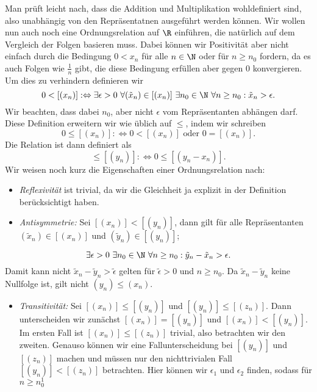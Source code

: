 \documentclass[letterpaper,10pt,english]{jupyterBook}
\begin{document}
Man prüft leicht nach, dass die Addition und Multiplikation wohldefiniert sind, also unabhängig von den Repräsentatnen ausgeführt werden können. Wir wollen nun auch noch eine Ordnungsrelation auf \(\R\) einführen, die natürlich auf dem Vergleich der Folgen basieren muss. Dabei können wir Positivität aber nicht einfach durch die Bedingung \(0 < x_n\) für alle \(n \in \N\) oder für \(n \geq n_0\) fordern, da es auch Folgen wie \(\frac{1}n\) gibt, die diese Bedingung erfüllen aber gegen \(0\) konvergieren.  Um dies zu verhindern definieren wir
\begin{equation*}
 0 < [(x_n)]:\Leftrightarrow \exists \epsilon > 0~\forall (\tilde x_n) \in [(x_n)]~\exists n_0 \in \N ~\forall n\geq n_0: \tilde x_n > \epsilon.
\end{equation*}
Wir beachten, dass dabei \(n_0\), aber nicht \(\epsilon\) vom Repräsentanten abhängen darf. Diese Definition erweitern wir wie üblich auf \(\leq\), indem wir schreiben
\begin{equation*}
0 \leq  [(x_n)]:\Leftrightarrow 0 < [(x_n)] \text{ oder } 0 = [(x_n)].
\end{equation*}
Die Relation ist dann definiert als
\begin{equation*}
[(x_n)] \leq [(y_n)] : \Leftrightarrow 0 \leq [(y_n-x_n)].
\end{equation*}
Wir weisen noch kurz die Eigenschaften einer Ordnungsrelation nach:
\begin{itemize}
\item {} 
\emph{Reflexivität} ist trivial, da wir die Gleichheit ja explizit in der Definition berücksichtigt haben.

\item {} 
\emph{Antisymmetrie:} Sei \([(x_n)] < [(y_n)]\), dann gilt für alle Repräsentanten \((\tilde x_n) \in [(x_n)]\) und
\((\tilde y_n) \in [(y_n)]\);

\end{itemize}
\begin{equation*}
\exists \epsilon > 0~\exists n_0 \in \N~\forall n \geq n_0: \tilde y_n - \tilde x_n > \epsilon.
\end{equation*}
Damit kann nicht \(\tilde x_n - \tilde y_n > \tilde \epsilon\) gelten für \(\tilde \epsilon >0\) und \(n \geq n_0\). Da \(\tilde x_n - \tilde y_n\) keine Nullfolge ist, gilt nicht \((y_n) \leq (x_n)\).
\begin{itemize}
\item {} 
\emph{Transitivität:} Sei \([(x_n)] \leq [(y_n)]\) und \([(y_n)] \leq [(z_n)]\). Dann unterscheiden wir zunächst \([(x_n)]=[(y_n)]\) und \([(x_n)]< [(y_n)]\). Im ersten Fall ist \([(x_n)] \leq [(z_n)]\) trivial, also betrachten wir den zweiten. Genauso können wir eine Fallunterscheidung bei \([(y_n)]\) und \([(z_n)]\) machen und müssen nur den nichttrivialen Fall \([(y_n)]<[(z_n)]\) betrachten. Hier können wir \(\epsilon_1\) und \(\epsilon_2\) finden, sodass für \(n\geq n_0^1\)

\end{itemize}
\end{document}
